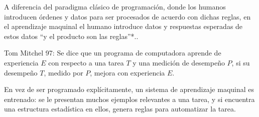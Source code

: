 A diferencia del paradigma clásico de programación, donde los humanos introducen órdenes y datos para ser procesados de acuerdo con dichas reglas, en el aprendizaje maquinal el humano introduce datos y respuestas esperadas de estos datos ``y el producto son las reglas''*..

Tom Mitchel 97:
Se dice que un programa de computadora aprende de experiencia $E$ con respecto a una tarea $T$ y una medición de desempeño $P$, si su desempeño $T$, medido por $P$, mejora con experiencia $E$.

En vez de ser programado explícitamente, un sistema de aprendizaje maquinal es entrenado: se le presentan muchos ejemplos relevantes a una tarea, y si encuentra una estructura estadística en ellos, genera reglas para automatizar la tarea.
